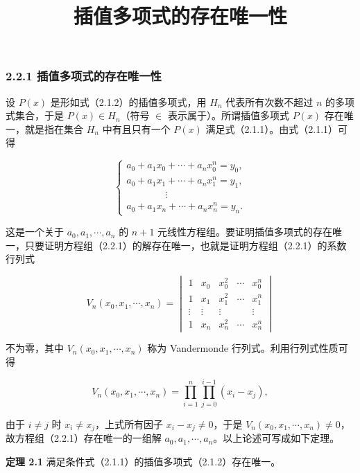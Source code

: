 \documentclass[
  10pt,
  fontset=fandol]{ctexart}
\title{插值多项式的存在唯一性}
\author{}
\date{}
\begin{document}
\maketitle

\subsubsection{2.2.1 插值多项式的存在唯一性}\label{ux63d2ux503cux591aux9879ux5f0fux7684ux5b58ux5728ux552fux4e00ux6027}

设 \(P(x)\) 是形如式（2.1.2）的插值多项式，用 \(H_n\) 代表所有次数不超过 \(n\) 的多项式集合，于是 \(P(x)\in H_n\)（符号 \(\in\) 表示属于）。所谓插值多项式 \(P(x)\) 存在唯一，就是指在集合 \(H_n\) 中有且只有一个 \(P(x)\) 满足式（2.1.1）。由式（2.1.1）可得

\[
\begin{cases}
a_0+a_1x_0+\cdots+a_nx_0^n=y_0,\\
a_0+a_1x_1+\cdots+a_nx_1^n=y_1,\\
\qquad\qquad\vdots\\
a_0+a_1x_n+\cdots+a_nx_n^n=y_n.
\end{cases}
\tag{2.2.1}
\]

这是一个关于 \(a_0,a_1,\cdots,a_n\) 的 \(n+1\) 元线性方程组。要证明插值多项式的存在唯一，只要证明方程组（2.2.1）的解存在唯一，也就是证明方程组（2.2.1）的系数行列式

\[
V_n(x_0,x_1,\cdots,x_n)=
\begin{vmatrix}
1 & x_0 & x_0^2 & \cdots & x_0^n\\
1 & x_1 & x_1^2 & \cdots & x_1^n\\
\vdots & \vdots & \vdots & & \vdots\\
1 & x_n & x_n^2 & \cdots & x_n^n
\end{vmatrix}
\tag{2.2.2}
\]

不为零，其中 \(V_n(x_0,x_1,\cdots,x_n)\) 称为 Vandermonde 行列式。利用行列式性质可得

\[
V_n(x_0,x_1,\cdots,x_n)
=\prod_{i=1}^{n}\prod_{j=0}^{i-1}(x_i-x_j),
\]

由于 \(i\ne j\) 时 \(x_i\ne x_j\)，上式所有因子 \(x_i-x_j\ne0\)，于是 \(V_n(x_0,x_1,\cdots,x_n)\ne0\)，故方程组（2.2.1）存在唯一的一组解 \(a_0,a_1,\cdots,a_n\)。以上论述可写成如下定理。

\textbf{定理 2.1} 满足条件式（2.1.1）的插值多项式（2.1.2）存在唯一。
\end{document}
